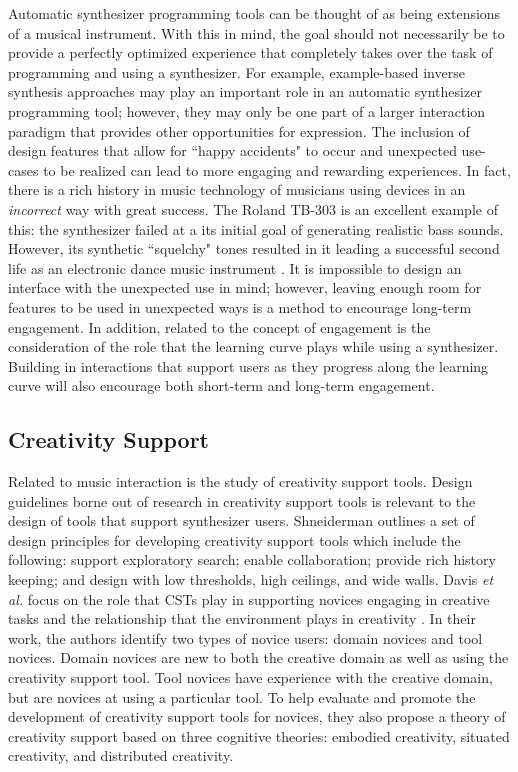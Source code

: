 Automatic synthesizer programming tools can be thought of as being extensions of a musical instrument. With this in mind, the goal should not necessarily be to provide a perfectly optimized experience that completely takes over the task of programming and using a synthesizer. For example, example-based inverse synthesis approaches may play an important role in an automatic synthesizer programming tool; however, they may only be one part of a larger interaction paradigm that provides other opportunities for expression. The inclusion of design features that allow for ``happy accidents" to occur and unexpected use-cases to be realized can lead to more engaging and rewarding experiences. In fact, there is a rich history in music technology of musicians using devices in an \textit{incorrect} way with great success. The Roland TB-303 is an excellent example of this: the synthesizer failed at a its initial goal of generating realistic bass sounds. However, its synthetic ``squelchy" tones resulted in it leading a successful second life as an electronic dance music instrument \cite{vine2011tb303}. It is impossible to design an interface with the unexpected use in mind; however, leaving enough room for features to be used in unexpected ways is a method to encourage long-term engagement. In addition, related to the concept of engagement is the consideration of the role that the learning curve plays while using a synthesizer. Building in interactions that support users as they progress along the learning curve will also encourage both short-term and long-term engagement.

\subsection{Creativity Support}
Related to music interaction is the study of creativity support tools. Design guidelines borne out of research in creativity support tools is relevant to the design of tools that support synthesizer users. Shneiderman \cite{shneiderman2007creativity} outlines a set of design principles for developing creativity support tools which include the following: support exploratory search; enable collaboration; provide rich history keeping; and design with low thresholds, high ceilings, and wide walls. Davis \textit{et al.} focus on the role that CSTs play in supporting novices engaging in creative tasks and the relationship that the environment plays in creativity \cite{davis2013toward}. In their work, the authors identify two types of novice users: domain novices and tool novices. Domain novices are new to both the creative domain as well as using the creativity support tool. Tool novices have experience with the creative domain, but are novices at using a particular tool. To help evaluate and promote the development of creativity support tools for novices, they also propose a theory of creativity support based on three cognitive theories: embodied creativity, situated creativity, and distributed creativity.

